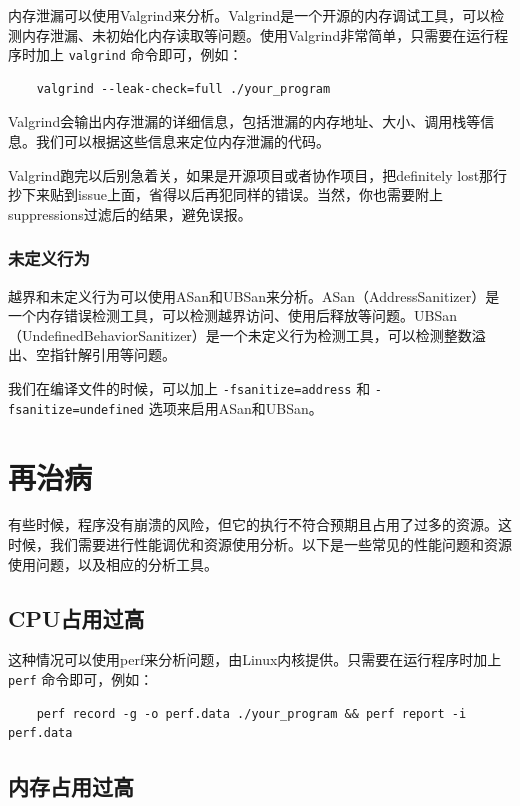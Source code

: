 内存泄漏可以使用Valgrind来分析。Valgrind是一个开源的内存调试工具，可以检测内存泄漏、未初始化内存读取等问题。使用Valgrind非常简单，只需要在运行程序时加上 \texttt{valgrind} 命令即可，例如：
\begin{verbatim}
    valgrind --leak-check=full ./your_program
\end{verbatim}

Valgrind会输出内存泄漏的详细信息，包括泄漏的内存地址、大小、调用栈等信息。我们可以根据这些信息来定位内存泄漏的代码。

Valgrind跑完以后别急着关，如果是开源项目或者协作项目，把definitely lost那行抄下来贴到issue上面，省得以后再犯同样的错误。当然，你也需要附上suppressions过滤后的结果，避免误报。

\subsubsection{未定义行为}

越界和未定义行为可以使用ASan和UBSan来分析。ASan（AddressSanitizer）是一个内存错误检测工具，可以检测越界访问、使用后释放等问题。UBSan（UndefinedBehaviorSanitizer）是一个未定义行为检测工具，可以检测整数溢出、空指针解引用等问题。

我们在编译文件的时候，可以加上 \texttt{-fsanitize=address} 和 \texttt{-fsanitize=undefined} 选项来启用ASan和UBSan。

\section{再治病}

有些时候，程序没有崩溃的风险，但它的执行不符合预期且占用了过多的资源。这时候，我们需要进行性能调优和资源使用分析。以下是一些常见的性能问题和资源使用问题，以及相应的分析工具。

\subsection{CPU占用过高}

这种情况可以使用perf来分析问题，由Linux内核提供。只需要在运行程序时加上 \texttt{perf} 命令即可，例如：
\begin{verbatim}
    perf record -g -o perf.data ./your_program && perf report -i perf.data
\end{verbatim}

\subsection{内存占用过高}

